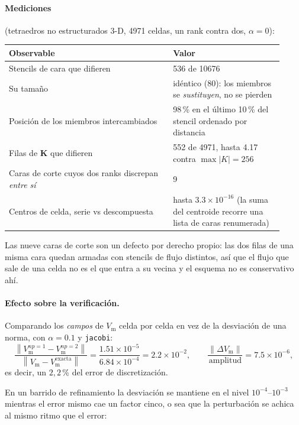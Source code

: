 \documentclass[11pt,a4paper]{article}
\newcommand{\code}[1]{\texttt{\small #1}}
\newcommand{\Vm}{V_{\text{m}}}
\newcommand{\Kstif}{\mathbf{K}}
\newcommand{\norm}[1]{\left\lVert #1 \right\rVert}
\begin{document}
\paragraph{Mediciones} (tetraedros no estructurados 3-D, 4971 celdas, un rank
contra dos, $\alpha=0$):

\begin{center}
\begin{tabular}{@{}p{0.55\linewidth}p{0.37\linewidth}@{}}
\toprule
Observable & Valor \\
\midrule
Stencils de cara que difieren & 536 de 10676 \\
Su tamaño & idéntico (80): los miembros se \emph{sustituyen}, no se pierden \\
Posición de los miembros intercambiados & 98\,\% en el último 10\,\% del stencil
   ordenado por distancia \\
Filas de $\Kstif$ que difieren & 552 de 4971, hasta 4.17 contra
   $\max|K| = 256$ \\
Caras de corte cuyos dos ranks discrepan \emph{entre sí} & 9 \\
Centros de celda, serie vs descompuesta & hasta $3.3\times10^{-16}$ (la suma del
   centroide recorre una lista de caras renumerada) \\
\bottomrule
\end{tabular}
\end{center}

Las nueve caras de corte son un defecto por derecho propio: las dos filas de una
misma cara quedan armadas con stencils de flujo distintos, así que el flujo que
sale de una celda no es el que entra a su vecina y el esquema no es conservativo
ahí.

\paragraph{Efecto sobre la verificación.} Comparando los \emph{campos} de $\Vm$
celda por celda en vez de la desviación de una norma, con $\alpha=0.1$ y
\code{jacobi}:
\[
  \frac{\norm{\Vm^{np=1}-\Vm^{np=2}}}{\norm{\Vm-\Vm^{\text{exacta}}}}
  = \frac{1.51\times10^{-5}}{6.84\times10^{-4}} = 2.2\times10^{-2},
  \qquad
  \frac{\norm{\Delta\Vm}}{\text{amplitud}} = 7.5\times10^{-6},
\]
es decir, un $2{,}2\,$\% del error de discretización.

En un barrido de refinamiento la desviación se mantiene en el nivel
$10^{-4}$--$10^{-3}$ mientras el error mismo cae un factor cinco, o sea que la
perturbación se achica al mismo ritmo que el error:
\end{document}
